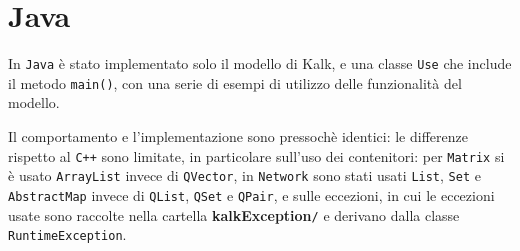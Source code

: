 \section{Java}

In \texttt{Java} è stato implementato solo il modello di Kalk, e una classe \texttt{Use} che include il metodo \texttt{main()}, con una 
serie di esempi di utilizzo delle funzionalità del modello.\par
Il comportamento e l'implementazione sono pressochè identici: le differenze rispetto al \texttt{C++} sono limitate, in particolare 
sull'uso dei contenitori: per \texttt{Matrix} si è usato \texttt{ArrayList} invece di \texttt{QVector}, in \texttt{Network} sono stati 
usati \texttt{List}, \texttt{Set} e \texttt{AbstractMap} invece di \texttt{QList}, \texttt{QSet} e \texttt{QPair}, e sulle eccezioni, 
in cui le eccezioni usate sono raccolte nella cartella \textbf{kalkException}\verb|/| e derivano dalla classe \texttt{RuntimeException}.
